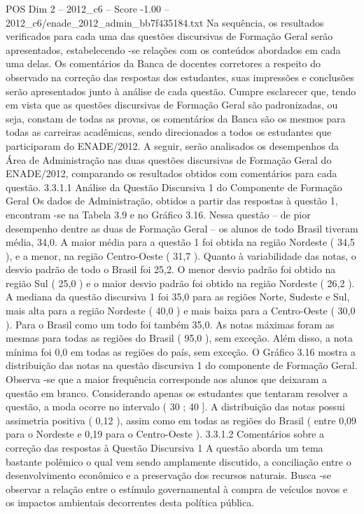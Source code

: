 \begin{textsample}{POS Dim 2 – 2012\_c6 – Score -1.00 – 2012\_c6/enade\_2012\_admin\_bb7f435184.txt}
Na sequência, os resultados verificados para cada uma das questões discursivas de Formação Geral serão apresentados, estabelecendo -se relações com os conteúdos abordados em cada uma delas.
Os comentários da Banca de docentes corretores a respeito do observado na correção das respostas dos estudantes, suas impressões e conclusões serão apresentados junto à análise de cada questão.
Cumpre esclarecer que, tendo em vista que as questões discursivas de Formação Geral são padronizadas, ou seja, constam de todas as provas, os comentários da Banca são os mesmos para todas as carreiras acadêmicas, sendo direcionados a todos os estudantes que participaram do ENADE/2012.
A seguir, serão analisados os desempenhos da Área de Administração nas duas questões discursivas de Formação Geral do ENADE/2012, comparando os resultados obtidos com comentários para cada questão. 3.3.1.1 Análise da Questão Discursiva 1 do Componente de Formação Geral Os dados de Administração, obtidos a partir das respostas à questão 1, encontram -se na Tabela 3.9 e no Gráfico 3.16.
Nessa questão – de pior desempenho dentre as duas de Formação Geral – os alunos de todo Brasil tiveram média, 34,0.
A maior média para a questão 1 foi obtida na região Nordeste ( 34,5 ), e a menor, na região Centro-Oeste ( 31,7 ).
Quanto à variabilidade das notas, o desvio padrão de todo o Brasil foi 25,2.
O menor desvio padrão foi obtido na região Sul ( 25,0 ) e o maior desvio padrão foi obtido na região Nordeste ( 26,2 ).
A mediana da questão discursiva 1 foi 35,0 para as regiões Norte, Sudeste e Sul, mais alta para a região Nordeste ( 40,0 ) e mais baixa para a Centro-Oeste ( 30,0 ).
Para o Brasil como um todo foi também 35,0.
As notas máximas foram as mesmas para todas as regiões do Brasil ( 95,0 ), sem exceção.
Além disso, a nota mínima foi 0,0 em todas as regiões do país, sem exceção.
O Gráfico 3.16 mostra a distribuição das notas na questão discursiva 1 do componente de Formação Geral.
Observa -se que a maior frequência corresponde aos alunos que deixaram a questão em branco.
Considerando apenas os estudantes que tentaram resolver a questão, a moda ocorre no intervalo ( 30 ; 40 ].
A distribuição das notas possui assimetria positiva ( 0,12 ), assim como em todas as regiões do Brasil ( entre 0,09 para o Nordeste e 0,19 para o Centro-Oeste ). 3.3.1.2 Comentários sobre a correção das respostas à Questão Discursiva 1 A questão aborda um tema bastante polêmico o qual vem sendo amplamente discutido, a conciliação entre o desenvolvimento econômico e a preservação dos recursos naturais.
Busca -se observar a relação entre o estímulo governamental à compra de veículos novos e os impactos ambientais decorrentes desta política pública.

\end{textsample}
